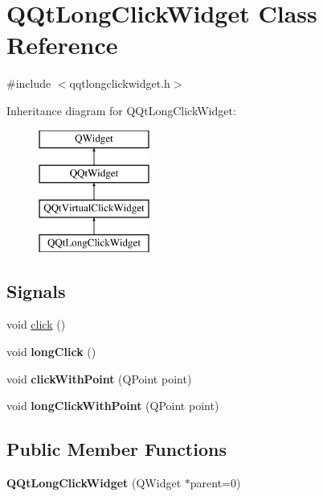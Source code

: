 \hypertarget{class_q_qt_long_click_widget}{}\section{Q\+Qt\+Long\+Click\+Widget Class Reference}
\label{class_q_qt_long_click_widget}


{\ttfamily \#include $<$qqtlongclickwidget.\+h$>$}

Inheritance diagram for Q\+Qt\+Long\+Click\+Widget\+:\begin{figure}[H]
\begin{center}
\leavevmode
\includegraphics[height=4.000000cm]{class_q_qt_long_click_widget}
\end{center}
\end{figure}
\subsection*{Signals}
\begin{DoxyCompactItemize}
\item 
void \mbox{\hyperlink{class_q_qt_long_click_widget_ab4994923edc5e1b1ac3c70ad122f496e}{click}} ()
\item 
\mbox{\label{class_q_qt_long_click_widget_a442a695e1420f07097cb63fb2f3e2ee1}} 
void {\bfseries long\+Click} ()
\item 
\mbox{\label{class_q_qt_long_click_widget_ac5330fab818365f880a9d53f0dd26885}} 
void {\bfseries click\+With\+Point} (Q\+Point point)
\item 
\mbox{\label{class_q_qt_long_click_widget_a0b548cd1e418a604d131b0eea22ea252}} 
void {\bfseries long\+Click\+With\+Point} (Q\+Point point)
\end{DoxyCompactItemize}
\subsection*{Public Member Functions}
\begin{DoxyCompactItemize}
\item 
\mbox{\label{class_q_qt_long_click_widget_a21f9ab5f8268b6079ca255bdfac61aed}} 
{\bfseries Q\+Qt\+Long\+Click\+Widget} (Q\+Widget $\ast$parent=0)
\end{DoxyCompactItemize}

